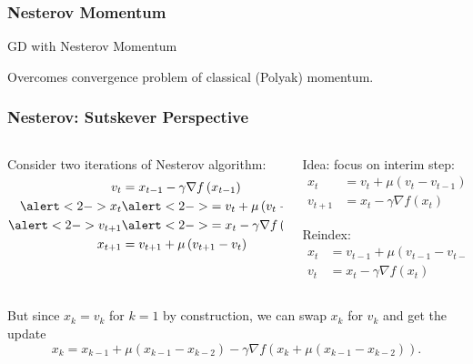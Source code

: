 \documentclass[aspectratio=1610,onlytextwidth]{beamer}
\begin{document}
\begin{frame}[c]
  \frametitle{Nesterov Momentum}
  \begin{algorithm}[H]
    \KwData{$\gamma >0$, $\mu \in [0,1)$}
    \caption{GD with Nesterov Momentum}
  \end{algorithm}

  \bigskip

  Overcomes convergence problem of classical (Polyak) momentum.

\end{frame}

\begin{frame}[c]
  \frametitle{Nesterov: Sutskever Perspective}
  \begin{columns}[T]
    \begin{column}{0.45\textwidth}
      Consider two iterations of Nesterov algorithm:
      \[
        \begin{aligned}
          v_{t}               & = x_{t-1} - \gamma \nabla f\left(x_{t-1} \right)         \\
          \alert<2->{x_{t}}   & \alert<2->{= v_{t} + \mu\left(v_{t} - v_{{t-1}} \right)} \\
          \alert<2->{v_{t+1}} & \alert<2->{= x_{t} - \gamma \nabla f\left(x_{t} \right)} \\
          x_{t+1}             & = v_{t+1} + \mu\left(v_{t+1} - v_{t} \right)
        \end{aligned}
      \]
    \end{column}

    \pause

    \begin{column}{0.45\textwidth}
      Idea: focus on interim step:
      \[
        \begin{aligned}
          x_{t}   & = v_{t} + \mu\left(v_{t} - v_{{t-1}} \right) \\
          v_{t+1} & = x_{t} - \gamma \nabla f\left(x_{t} \right)
        \end{aligned}
      \]

      \pause

      Reindex:
      \[
        \begin{aligned}
          x_{t} & = v_{t-1} + \mu\left(v_{t-1} - v_{{t-2}} \right) \\
          v_{t} & = x_{t} - \gamma \nabla f\left(x_{t} \right)
        \end{aligned}
      \]
    \end{column}

  \end{columns}

  \pause \bigskip

  But since $x_k = v_k$ for $k=1$ by construction, we can swap $x_k$ for $v_k$ and
  get the update
  \[
    x_k = x_{k-1} + \mu(x_{k-1} - x_{k-2}) - \gamma \nabla f(x_{k} + \mu(x_{k-1} - x_{k-2})).
  \]
\end{frame}
\end{document}
